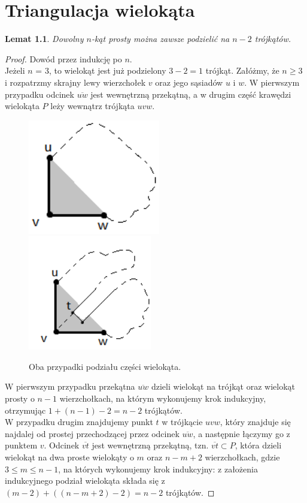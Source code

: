 \documentclass{xmgr}
\newtheorem{Lemat}{Lemat}
\theoremstyle{definition}
\begin{document}
\chapter{Triangulacja wielokąta}\label{triangulacja}
\begin{Lemat}\label{podzial na trojkaty}
Dowolny $n$-kąt prosty można zawsze podzielić na $n-2$ trójkątów.
\end{Lemat}
\begin{proof}
	Dowód przez indukcję po $n$.
	\\Jeżeli $n$ = 3, to wielokąt jest już podzielony $3-2 = 1$ trójkąt.
	Załóżmy, że $n \ge 3$ i rozpatrzmy skrajny lewy wierzchołek $v$ oraz jego sąsiadów $u$ i $w$.
	W pierwszym przypadku odcinek $\overline{uw}$ jest wewnętrzną przekątną, a w drugim część krawędzi wielokąta $P$ leży wewnątrz trójkąta $uvw$.

  \begin{figure}[ht!]
    \centering
    \includegraphics[height=5cm]{rysunki/triangulacja_1.png}
    \includegraphics[height=5cm]{rysunki/triangulacja_2.png}
    \caption{Oba przypadki podziału części wielokąta.}
  \end{figure} 
	
	\indent W pierwszym przypadku przekątna $\overline{u w}$ dzieli wielokąt na trójkąt oraz wielokąt prosty o $n-1$ wierzchołkach, na którym wykonujemy krok indukcyjny, otrzymując $1 + (n-1) -2 = n-2$ trójkątów.
	\\\indent W przypadku drugim znajdujemy punkt $t$ w trójkącie $uvw$, który znajduje się najdalej od prostej przechodzącej przez odcinek $\overline{uw}$, a następnie łączymy go z punktem $v$. Odcinek $\overline{v t}$ jest wewnętrzną przekątną, tzn. $\overline{vt} \subset P$, która dzieli wielokąt na dwa proste wielokąty o $m$ oraz $n-m + 2$ wierzchołkach, gdzie $3 \le m \le n-1$, na których wykonujemy krok indukcyjny: z założenia indukcyjnego podział wielokąta składa się z $(m-2) + ((n-m + 2) -2) = n-2$ trójkątów.
\end{proof}
\end{document}
